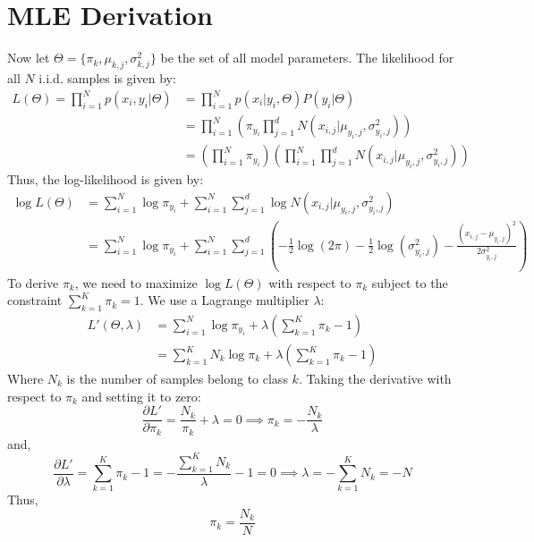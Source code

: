 \documentclass[11pt, a4paper, oneside]{memoir}
\begin{document}
\section{MLE Derivation}
Now let $\Theta = \{\pi_k, \mu_{k,j}, \sigma^2_{k,j}\}$ be the set of all model parameters.
The likelihood for all $N$ i.i.d. samples is given by:
\begin{align*}
    L(\Theta) = \prod_{i=1}^{N} p(x_i, y_i | \Theta) & = \prod_{i=1}^{N} p(x_i | y_i, \Theta) P(y_i | \Theta)                                                                               \\
                                                     & = \prod_{i=1}^{N} \left( \pi_{y_i} \prod_{j=1}^{d} N(x_{i,j} | \mu_{y_i,j}, \sigma^2_{y_i,j}) \right)                                \\
                                                     & = \left( \prod_{i=1}^{N} \pi_{y_i} \right) \left( \prod_{i=1}^{N} \prod_{j=1}^{d} N(x_{i,j} | \mu_{y_i,j}, \sigma^2_{y_i,j}) \right)
\end{align*}
Thus, the log-likelihood is given by:
\begin{align*}
    \log L(\Theta) & = \sum_{i=1}^{N} \log \pi_{y_i} + \sum_{i=1}^{N} \sum_{j=1}^{d} \log N(x_{i,j} | \mu_{y_i,j}, \sigma^2_{y_i,j})                                                                                   \\
                   & = \sum_{i=1}^{N} \log \pi_{y_i} + \sum_{i=1}^{N} \sum_{j=1}^{d} \left( -\frac{1}{2} \log(2\pi) - \frac{1}{2} \log(\sigma^2_{y_i,j}) - \frac{(x_{i,j} - \mu_{y_i,j})^2}{2\sigma^2_{y_i,j}} \right)
\end{align*}
To derive $\pi_k$, we need to maximize $\log L(\Theta)$ with respect to $\pi_k$ subject to the constraint $\sum_{k=1}^{K} \pi_k = 1$.
We use a Lagrange multiplier $\lambda$:
\begin{align*}
    L'(\Theta, \lambda) & = \sum_{i=1}^{N} \log \pi_{y_i} + \lambda \left( \sum_{k=1}^{K} \pi_k - 1 \right) \\
                        & = \sum_{k=1}^{K} N_k \log \pi_k + \lambda \left( \sum_{k=1}^{K} \pi_k - 1 \right)
\end{align*}
Where $N_k$ is the number of samples belong to class $k$.
Taking the derivative with respect to $\pi_k$ and setting it to zero:
\[ \frac{\partial L'}{\partial \pi_k} = \frac{N_k}{\pi_k} + \lambda = 0 \implies \pi_k = -\frac{N_k}{\lambda} \]
and,
\[ \frac{\partial L'}{\partial \lambda} = \sum_{k=1}^{K} \pi_k - 1 = -\frac{\sum_{k=1}^{K} N_k}{\lambda} - 1 = 0 \implies \lambda = -\sum_{k=1}^{K} N_k = -N \]
Thus,
\[ \pi_k = \frac{N_k}{N} \]
\end{document}
